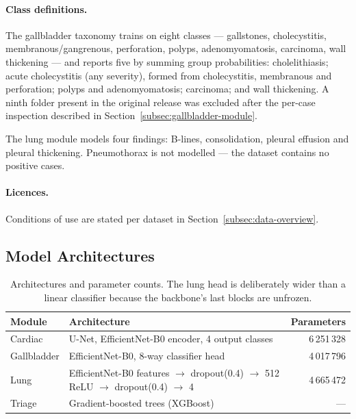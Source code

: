 \paragraph{Class definitions.} The gallbladder taxonomy trains on eight classes ---
gallstones, cholecystitis, membranous/gangrenous, perforation, polyps, adenomyomatosis,
carcinoma, wall thickening --- and reports five by summing group probabilities:
cholelithiasis; acute cholecystitis (any severity), formed from cholecystitis, membranous and
perforation; polyps and adenomyomatosis; carcinoma; and wall thickening. A ninth folder present
in the original release was excluded after the per-case inspection described in
Section~\ref{subsec:gallbladder-module}.

The lung module models four findings: B-lines, consolidation, pleural effusion and pleural
thickening. Pneumothorax is not modelled --- the dataset contains no positive cases.

\paragraph{Licences.} Conditions of use are stated per dataset in Section~\ref{subsec:data-overview}.

\subsection{Model Architectures}
\label{app:architectures}

\begin{table}[H]
  \centering
  \small
  \begin{tabularx}{\textwidth}{@{}lXr@{}}
    \toprule
    Module & Architecture & Parameters \\
    \midrule
    Cardiac & U-Net, EfficientNet-B0 encoder, 4 output classes & 6\,251\,328 \\
    Gallbladder & EfficientNet-B0, 8-way classifier head & 4\,017\,796 \\
    Lung & EfficientNet-B0 features $\rightarrow$ dropout(0.4) $\rightarrow$ 512 ReLU
      $\rightarrow$ dropout(0.4) $\rightarrow$ 4 & 4\,665\,472 \\
    Triage & Gradient-boosted trees (XGBoost) & --- \\
    \bottomrule
  \end{tabularx}
  \caption{Architectures and parameter counts. The lung head is deliberately wider than a
    linear classifier because the backbone's last blocks are unfrozen.}
  \label{tab:app-arch}
\end{table}

